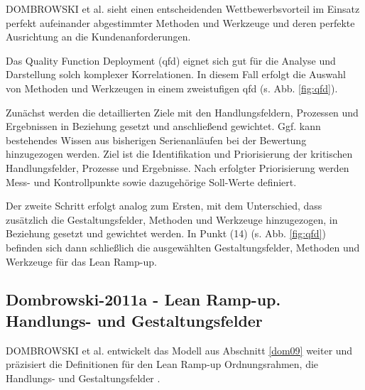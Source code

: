 DOMBROWSKI et al. sieht einen entscheidenden Wettbewerbsvorteil im Einsatz perfekt aufeinander abgestimmter Methoden und Werkzeuge und deren perfekte Ausrichtung an die Kundenanforderungen. 

Das Quality Function Deployment (\gls{qfd}) eignet sich gut für die Analyse und Darstellung solch komplexer Korrelationen. In diesem Fall erfolgt die Auswahl von Methoden und Werkzeugen in einem zweistufigen \gls{qfd} (s. Abb. \ref{fig:qfd}). 

Zunächst werden die detaillierten Ziele mit den Handlungsfeldern, Prozessen und Ergebnissen in Beziehung gesetzt und anschließend gewichtet. Ggf. kann bestehendes Wissen aus bisherigen Serienanläufen bei der Bewertung hinzugezogen werden. 
Ziel ist die Identifikation und Priorisierung der kritischen Handlungsfelder, Prozesse und Ergebnisse.
Nach erfolgter Priorisierung werden Mess- und Kontrollpunkte sowie dazugehörige Soll-Werte definiert. 

Der zweite Schritt erfolgt analog zum Ersten, mit dem Unterschied, dass zusätzlich die Gestaltungsfelder, Methoden und Werkzeuge hinzugezogen, in Beziehung gesetzt und gewichtet werden. 
In Punkt (14) (s. Abb. \ref{fig:qfd}) befinden sich dann schließlich die ausgewählten Gestaltungsfelder, Methoden und Werkzeuge für das Lean Ramp-up. 


\subsection*{Dombrowski-2011a - Lean Ramp-up. Handlungs- und Gestaltungsfelder}\label{sec:dom11a}

DOMBROWSKI et al. entwickelt das Modell aus Abschnitt \ref{dom09} %
weiter und präzisiert die Definitionen für den Lean Ramp-up Ordnungsrahmen, die Handlungs- und Gestaltungsfelder \cite{Dombrowski2011a}. 

